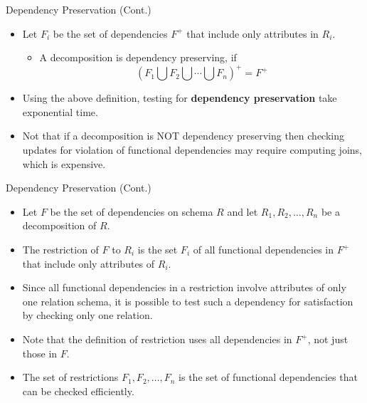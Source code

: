 \documentclass{beamer}
\begin{document}
\begin{frame}{Dependency Preservation (Cont.)}
    \begin{itemize}
        \item Let $F_i$ be the set of dependencies $F^+$ that include only attributes in $R_i$.
            \begin{itemize}
                \item A decomposition is dependency preserving, if
                    $$
                        (F_1 \bigcup F_2 \bigcup \cdots \bigcup F_n )^+ = F^+
                    $$
            \end{itemize}

        \item Using the above definition, testing for \textbf{dependency preservation} take exponential time.
        \item Not that if a decomposition is NOT dependency preserving then checking updates for violation of functional dependencies may require computing joins, which is expensive.
    \end{itemize}
\end{frame}

\begin{frame}{Dependency Preservation (Cont.)}
    \begin{itemize}
        \item Let $F$ be the set of dependencies on schema $R$ and let $R_1, R_2, \ldots, R_n$ be a decomposition of $R$.
        \item The restriction of $F$ to $R_i$ is the set $F_i$ of all functional dependencies in $F^+$ that include only attributes of $R_i$.
        \item Since all functional dependencies in a restriction involve attributes of only one relation schema, it is possible to test such a dependency for satisfaction by checking only one relation.
        \item Note that the definition of restriction uses all dependencies in $F^+$, not just those in $F$.
        \item The set of restrictions $F_1, F_2 , \ldots, F_n$ is the set of functional dependencies that can be checked efficiently.
    \end{itemize}
\end{frame}
\end{document}
